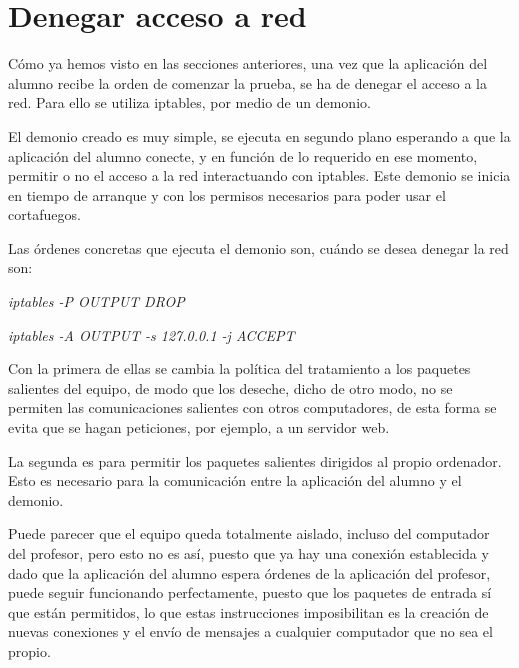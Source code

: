 \section{Denegar acceso a red}
\label{sec:iteracion:denegarRed}

Cómo ya hemos visto en las secciones anteriores, una vez que la aplicación del alumno recibe la orden de comenzar la prueba, se ha de denegar el acceso a la red. Para ello se utiliza iptables, por medio de un demonio.
\newline

El demonio creado es muy simple, se ejecuta en segundo plano esperando a que la aplicación del alumno conecte, y en función de lo requerido en ese momento, permitir o no el acceso a la red interactuando con iptables. Este demonio se inicia en tiempo de arranque y con los permisos necesarios para poder usar el cortafuegos.
\newline

Las órdenes concretas que ejecuta el demonio son, cuándo se desea denegar la red son:

\begin{center}

    \emph{iptables -P OUTPUT DROP}

    \emph{iptables -A OUTPUT -s 127.0.0.1 -j ACCEPT}

\end{center}

Con la primera de ellas se cambia la política del tratamiento a los paquetes salientes del equipo, de modo que los deseche, dicho de otro modo, no se permiten las comunicaciones salientes con otros computadores, de esta forma se evita que se hagan peticiones, por ejemplo, a un servidor web.
\newline

La segunda es para permitir los paquetes salientes dirigidos al propio ordenador. Esto es necesario para la comunicación entre la aplicación del alumno y el demonio.
\newline

Puede parecer que el equipo queda totalmente aislado, incluso del computador del profesor, pero esto no es así, puesto que ya hay una conexión establecida y dado que la aplicación del alumno espera órdenes de la aplicación del profesor, puede seguir funcionando perfectamente, puesto que los paquetes de entrada sí que están permitidos, lo que estas instrucciones imposibilitan es la creación de nuevas conexiones y el envío de mensajes a cualquier computador que no sea el propio.


